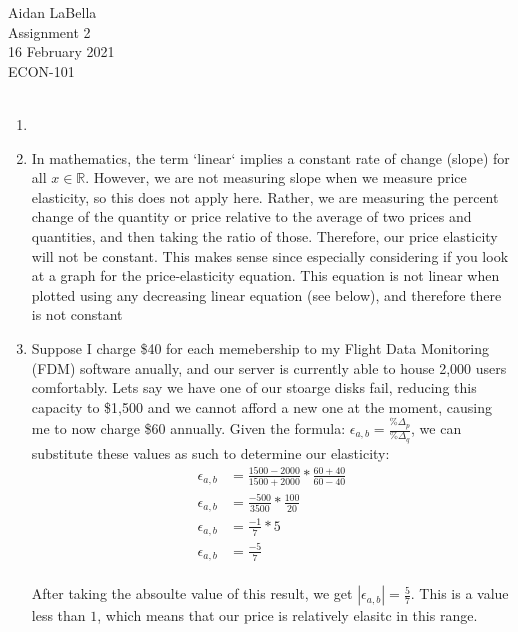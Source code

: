\documentclass[12pt]{article}
\begin{document}
\noindent
Aidan LaBella \\
Assignment 2 \\ 
16 February 2021\\
ECON-101 \\
\\
\begin{enumerate}
\item
    
\item
    In mathematics, the term `linear` implies a constant rate of change (slope) for all $x \in \mathbb{R}$. However, we are not measuring slope when we measure price elasticity, so this does not apply here. Rather, we are measuring the percent change of the quantity or price relative to the average of two prices and quantities, and then taking the ratio of those. Therefore, our price elasticity will not be constant. This makes sense since especially considering if you look at a graph for the price-elasticity equation. This equation is not linear when plotted using any decreasing linear equation (see below), and therefore there is not constant   \\

    
\item
    Suppose I charge \$40 for each memebership to my Flight Data Monitoring (FDM) software anually, and our server is currently able to house 2,000 users comfortably. Lets say we have one of our stoarge disks fail, reducing this capacity to \$1,500 and we cannot afford a new one at the moment, causing me to now charge \$60 annually. Given the formula: $\epsilon_{a,b} = \frac{\% \Delta_p}{\% \Delta_q}$, we can substitute these values as such to determine our elasticity: \\

\begin{equation}
    \begin{split}
        \epsilon_{a,b} &= \frac{1500 - 2000}{1500 + 2000} * \frac{60 + 40}{60 - 40} \\
        \epsilon_{a,b} &= \frac{-500}{3500} * \frac{100}{20} \\
        \epsilon_{a,b} &= \frac{-1}{7} * 5 \\
        \epsilon_{a,b} &= \frac{-5}{7} \\
    \end{split}
\end{equation}

After taking the absoulte value of this result, we get $|\epsilon_{a,b}| = \frac{5}{7}$. This is a value less than $1$, which means that our price is relatively elasitc in this range. 

\end{enumerate}
\end{document}
